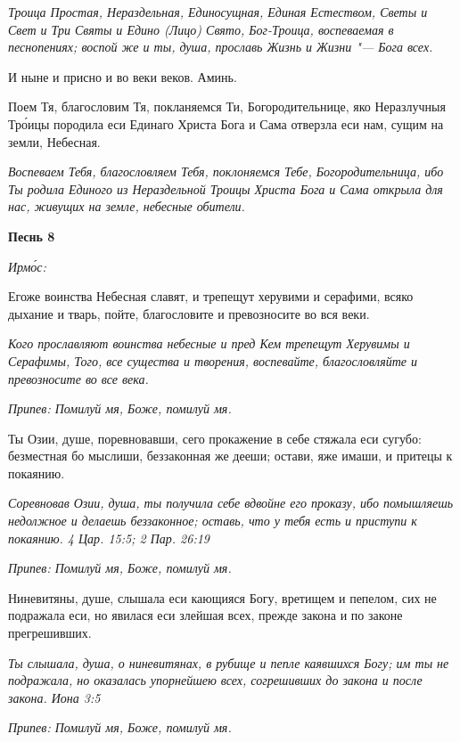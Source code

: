 \itshape Троица Простая, Нераздельная, Единосущная, Единая Естеством, Светы и Свет и Три Святы и Едино (Лицо) Свято, Бог-Троица, воспеваемая в песнопениях; воспой же и ты, душа, прославь Жизнь и Жизни "--- Бога всех.\normalfont{}


И ныне и присно и во веки веков. Аминь.


Поем Тя, благословим Тя, покланяемся Ти, Богородительнице, яко Неразлучныя Тро́ицы породила еси Единаго Христа Бога и Сама отверзла еси нам, сущим на земли, Небесная.


\itshape Воспеваем Тебя, благословляем Тебя, поклоняемся Тебе, Богородительница, ибо Ты родила Единого из Нераздельной Троицы Христа Бога и Сама открыла для нас, живущих на земле, небесные обители.\normalfont{}





\bfseries Песнь 8\normalfont{}


\itshape Ирмо́с:\normalfont{}


Егоже воинства Небесная славят, и трепещут херувими и серафими, всяко дыхание и тварь, пойте, благословите и превозносите во вся веки.


\itshape Кого прославляют воинства небесные и пред Кем трепещут Херувимы и Серафимы, Того, все существа и творения, воспевайте, благословляйте и превозносите во все века.\normalfont{}


\itshape Припев:\normalfont{} Помилуй мя, Боже, помилуй мя.


Ты Озии, душе, поревновавши, сего прокажение в себе стяжала еси сугубо: безместная бо мыслиши, беззаконная же дееши; остави, яже имаши, и притецы к покаянию.


\itshape Соревновав Озии, душа, ты получила себе вдвойне его проказу, ибо помышляешь недолжное и делаешь беззаконное; оставь, что у тебя есть и приступи к покаянию. 4 Цар. 15:5; 2 Пар. 26:19\normalfont{}


\itshape Припев:\normalfont{} Помилуй мя, Боже, помилуй мя.


Ниневитяны, душе, слышала еси кающияся Богу, вретищем и пепелом, сих не подражала еси, но явилася еси злейшая всех, прежде закона и по законе прегрешивших.


\itshape Ты слышала, душа, о ниневитянах, в рубище и пепле каявшихся Богу; им ты не подражала, но оказалась упорнейшею всех, согрешивших до закона и после закона. Иона 3:5\normalfont{}


\itshape Припев:\normalfont{} Помилуй мя, Боже, помилуй мя.


